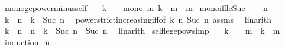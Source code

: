 \begin{isabellebody}
\ mono{\isacharunderscore}{\kern0pt}ge{}{\isacharunderscore}{\kern0pt}power{\isacharunderscore}{\kern0pt}minus{\isacharunderscore}{\kern0pt}self{\isacharcolon}{\kern0pt}\isanewline
\ \ \ {\isachardoublequoteopen}k\ {\isasymge}\ {}{\isachardoublequoteclose}\ \ {\isachardoublequoteopen}mono\ {\isacharparenleft}{\kern0pt}{\isasymlambda}m{\isachardot}{\kern0pt}\ k\ {\isacharcircum}{\kern0pt}\ m\ {\isacharminus}{\kern0pt}\ m{\isacharparenright}{\kern0pt}{\isachardoublequoteclose}\isanewline
%
\isadelimproof
%
\endisadelimproof
%
\isatagproof
{}\isamarkupfalse%
\ mono{\isacharunderscore}{\kern0pt}iff{\isacharunderscore}{\kern0pt}le{\isacharunderscore}{\kern0pt}Suc\isanewline
{}\isamarkupfalse%
\isanewline
\ \ \isamarkupfalse%
\ n\isanewline
\ \ \isamarkupfalse%
\ {\isachardoublequoteopen}k\ {\isacharcircum}{\kern0pt}\ n\ {\isacharless}{\kern0pt}\ k\ {\isacharcircum}{\kern0pt}\ Suc\ n{\isachardoublequoteclose}\ \isamarkupfalse%
\ power{\isacharunderscore}{\kern0pt}strict{\isacharunderscore}{\kern0pt}increasing{\isacharunderscore}{\kern0pt}iff{\isacharbrackleft}{\kern0pt}of\ k\ {\isachardoublequoteopen}n{\isachardoublequoteclose}\ {\isachardoublequoteopen}Suc\ n{\isachardoublequoteclose}{\isacharbrackright}{\kern0pt}\ assms\ \isamarkupfalse%
\ linarith\isanewline
\ \ \isamarkupfalse%
\ {\isachardoublequoteopen}k\ {\isacharcircum}{\kern0pt}\ n\ {\isacharminus}{\kern0pt}\ n\ {\isasymle}\ k\ {\isacharcircum}{\kern0pt}\ Suc\ n\ {\isacharminus}{\kern0pt}\ Suc\ n{\isachardoublequoteclose}\ \isamarkupfalse%
\ linarith\isanewline
{}\isamarkupfalse%
%
\endisatagproof
{\isafoldproof}%
%
\isadelimproof
\isanewline
%
\endisadelimproof
\isanewline
{}\isamarkupfalse%
\ self{\isacharunderscore}{\kern0pt}le{\isacharunderscore}{\kern0pt}ge{}{\isacharunderscore}{\kern0pt}pow{\isacharbrackleft}{\kern0pt}simp{\isacharbrackright}{\kern0pt}{\isacharcolon}{\kern0pt}\isanewline
\ \ \ {\isachardoublequoteopen}k\ {\isasymge}\ {}{\isachardoublequoteclose}\ \ {\isachardoublequoteopen}m\ {\isasymle}\ k\ {\isacharcircum}{\kern0pt}\ m{\isachardoublequoteclose}\isanewline
%
\isadelimproof
%
\endisadelimproof
%
\isatagproof
{}\isamarkupfalse%
\ {\isacharparenleft}{\kern0pt}induction\ m{\isacharparenright}{\kern0pt}\isanewline
\ \ \isamarkupfalse%
\ {}\ \isamarkupfalse%

\end{isabellebody}
